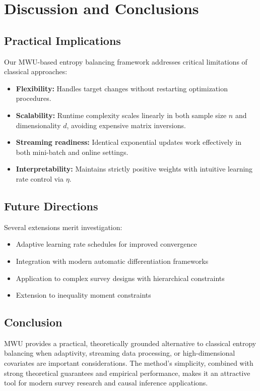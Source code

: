 \documentclass[12pt, letterpaper]{article}
\begin{document}
\section{Discussion and Conclusions}

\subsection{Practical Implications}

Our MWU-based entropy balancing framework addresses critical limitations of classical approaches:

\begin{itemize}
\item \textbf{Flexibility:} Handles target changes without restarting optimization procedures.
\item \textbf{Scalability:} Runtime complexity scales linearly in both sample size $n$ and dimensionality $d$, avoiding expensive matrix inversions.
\item \textbf{Streaming readiness:} Identical exponential updates work effectively in both mini-batch and online settings.
\item \textbf{Interpretability:} Maintains strictly positive weights with intuitive learning rate control via $\eta$.
\end{itemize}

\subsection{Future Directions}

Several extensions merit investigation:
\begin{itemize}
\item Adaptive learning rate schedules for improved convergence
\item Integration with modern automatic differentiation frameworks
\item Application to complex survey designs with hierarchical constraints
\item Extension to inequality moment constraints
\end{itemize}

\subsection{Conclusion}

MWU provides a practical, theoretically grounded alternative to classical entropy balancing when adaptivity, streaming data processing, or high-dimensional covariates are important considerations. The method's simplicity, combined with strong theoretical guarantees and empirical performance, makes it an attractive tool for modern survey research and causal inference applications.



\end{document}
